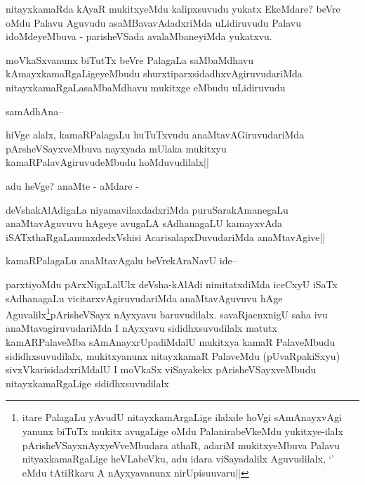 
\begin{artha}
nitayxkamaRda kAyaR mukitxyeMdu kalipxsuvudu yukatx EkeMdare? beVre oMdu Palavu Aguvudu asaMBavavAdadxriMda uLidiruvudu Palavu idoMdeyeMbuva - parisheVSada avalaMbaneyiMda yukatxvu.
\end{artha}

\begin{artha}
moVkaSxvanunx biTutTx beVre PalagaLa saMbaMdhavu kAmayxkamaRgaLigeyeMbudu shurxtiparxsidadhxvAgiruvudariMda nitayxkamaRgaLasaMbaMdhavu mukitxge eMbudu uLidiruvudu
\end{artha}

\begin{artha}
samAdhAna--
\end{artha}

\begin{artha}
hiVge alalx, kamaRPalagaLu huTuTxvudu anaMtavAGiruvudariMda pArsheVSayxveMbuva nayxyada mUlaka mukitxyu kamaRPalavAgiruvudeMbudu hoMduvudilalx||
\end{artha}

\begin{artha}
adu heVge? anaMte - aMdare -
\end{artha}

\begin{artha}
deVshakAlAdigaLa niyamavilaxdadxriMda puruSarakAmanegaLu anaMtavAguvuvu hAgeye avugaLA sAdhanagaLU kamayxvAda iSATxthaRgaLanunxdedxVshisi AcarisalapxDuvudariMda anaMtavAgive||
\end{artha}

\begin{artha}
kamaRPalagaLu anaMtavAgalu beVrekAraNavU ide--
\end{artha}

\begin{artha}
parxtiyoMdu pArxNigaLalUlx deVsha-kAlAdi nimitatxdiMda iceCxyU iSaTx sAdhanagaLu vicitarxvAgiruvudariMda anaMtavAguvuvu hAge Aguvalilx\footnote{itare PalagaLu yAvudU nitayxkamArgaLige ilalxde hoVgi sAmAnayxvAgi yanunx biTuTx mukitx avugaLige oMdu PalanirabeVkeMdu yukitxye-ilalx pArisheVSayxnAyxyeVveMbudara athaR, adariM mukitxyeMbuva Palavu nityaxkamaRgaLige heVLabeVku, adu idara viSayadalilx Aguvudilalx, `\stext' eMdu tAtiRkaru A nAyxyavanunx nirUpisuuvaru||}pArisheVSayx nAyxyavu baruvudilalx. savaRjacnxnigU saha ivu anaMtavagiruvudariMda I nAyxyavu sididhxsuvudilalx matutx kamARPalaveMba sAmAnayxrUpadiMdalU mukitxya kamaR PalaveMbudu sididhxsuvudilalx, mukitxyanunx nitayxkamaR PalaveMdu (pUvaRpakiSxyu) sivxVkarisidadxriMdalU I moVkaSx viSayakekx pArisheVSayxveMbudu nitayxkamaRgaLige sididhxsuvudilalx
\end{artha}

